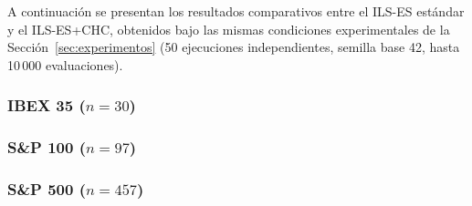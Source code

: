 A continuación se presentan los resultados comparativos entre el ILS-ES estándar y el
ILS-ES+CHC, obtenidos bajo las mismas condiciones experimentales de la Sección~\ref{sec:experimentos}
(50 ejecuciones independientes, semilla base 42, hasta 10\,000 evaluaciones).

\subsubsection*{IBEX 35 ($n=30$)}

\begin{table}[H]
\centering
\caption{Comparación ILS-ES vs.\ ILS-ES+CHC -- IBEX 35}
\label{tab:results_ilses_chc_ibex}
\end{table}

\subsubsection*{S\&P 100 ($n=97$)}

\begin{table}[H]
\centering
\caption{Comparación ILS-ES vs.\ ILS-ES+CHC -- S\&P 100}
\label{tab:results_ilses_chc_sp100}
\end{table}

\subsubsection*{S\&P 500 ($n=457$)}

\begin{table}[H]
\centering
\caption{Comparación ILS-ES vs.\ ILS-ES+CHC -- S\&P 500}
\label{tab:results_ilses_chc_sp500}
\end{table}

